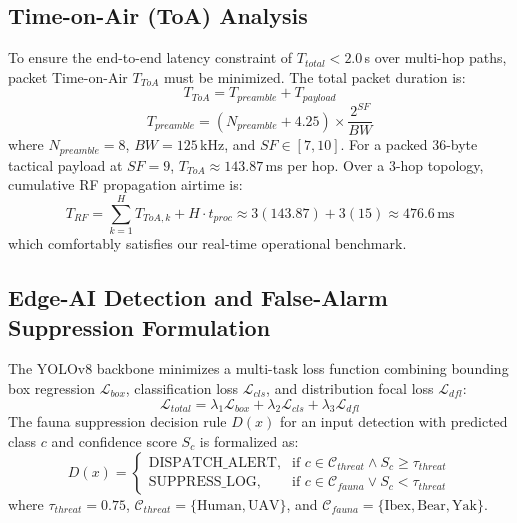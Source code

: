 \documentclass[conference]{IEEEtran}
\begin{document}
\subsection{Time-on-Air (ToA) Analysis}
To ensure the end-to-end latency constraint of $T_{total} < 2.0$\,s over multi-hop paths, packet Time-on-Air $T_{ToA}$ must be minimized. The total packet duration is:
\begin{equation}
T_{ToA} = T_{preamble} + T_{payload}
\end{equation}
\begin{equation}
T_{preamble} = (N_{preamble} + 4.25) \times \frac{2^{SF}}{BW}
\end{equation}
where $N_{preamble} = 8$, $BW = 125$\,kHz, and $SF \in [7, 10]$. For a packed 36-byte tactical payload at $SF = 9$, $T_{ToA} \approx 143.87$\,ms per hop. Over a 3-hop topology, cumulative RF propagation airtime is:
\begin{equation}
T_{RF} = \sum_{k=1}^{H} T_{ToA, k} + H \cdot t_{proc} \approx 3(143.87) + 3(15) \approx 476.6\,\text{ms}
\end{equation}
which comfortably satisfies our real-time operational benchmark.

\subsection{Edge-AI Detection and False-Alarm Suppression Formulation}
The YOLOv8 backbone minimizes a multi-task loss function combining bounding box regression $\mathcal{L}_{box}$, classification loss $\mathcal{L}_{cls}$, and distribution focal loss $\mathcal{L}_{dfl}$:
\begin{equation}
\mathcal{L}_{total} = \lambda_1 \mathcal{L}_{box} + \lambda_2 \mathcal{L}_{cls} + \lambda_3 \mathcal{L}_{dfl}
\end{equation}
The fauna suppression decision rule $D(x)$ for an input detection with predicted class $c$ and confidence score $S_c$ is formalized as:
\begin{equation}
D(x) = 
\begin{cases}
\text{DISPATCH\_ALERT}, & \text{if } c \in \mathcal{C}_{threat} \land S_c \ge \tau_{threat} \\
\text{SUPPRESS\_LOG},   & \text{if } c \in \mathcal{C}_{fauna} \lor S_c < \tau_{threat}
\end{cases}
\end{equation}
where $\tau_{threat} = 0.75$, $\mathcal{C}_{threat} = \{\text{Human}, \text{UAV}\}$, and $\mathcal{C}_{fauna} = \{\text{Ibex}, \text{Bear}, \text{Yak}\}$.
\end{document}
